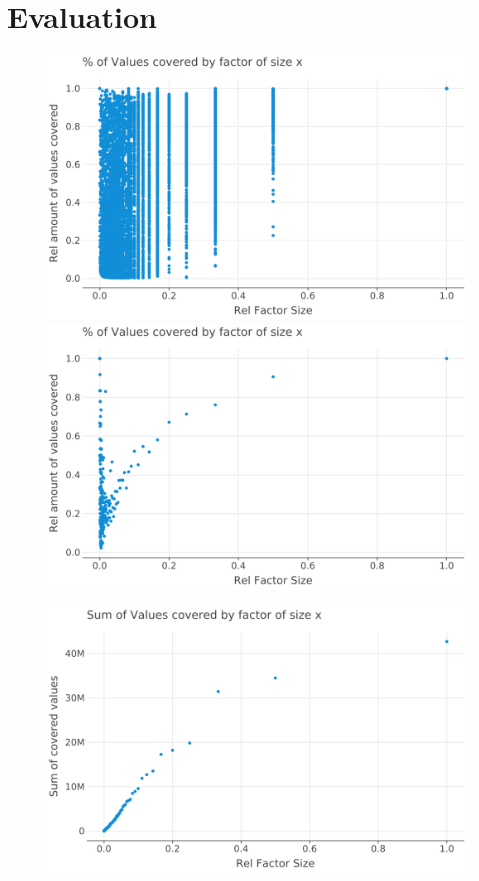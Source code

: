 
\chapter{Evaluation}
\label{ch:Evaluation}
\begin{figure}[h]
	\includegraphics[width=\linewidth]{plots/SHORTEST_PERIODS-all-relative-values-by-factor-size.png}
	\includegraphics[width=\linewidth]{plots/SHORTEST_PERIODS-all-relative-values-by-factor-size-average.png}
\end{figure}
\begin{figure}
	\includegraphics[width=\linewidth]{plots/GREEDY_SHORT_FACTORS-all-values-by-factor-size.png}
\end{figure}


